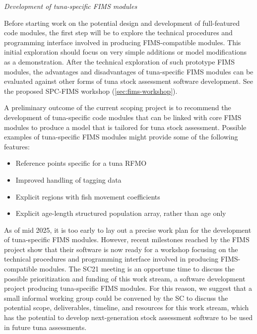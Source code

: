 \documentclass{SCreport}
\begin{document}
\vspace{2ex}

\textit{Development of tuna-specific FIMS modules}

Before starting work on the potential design and development of full-featured
code modules, the first step will be to explore the technical procedures and
programming interface involved in producing FIMS-compatible modules. This
initial exploration should focus on very simple additions or model modifications
as a demonstration. After the technical exploration of such prototype FIMS
modules, the advantages and disadvantages of tuna-specific FIMS modules can be
evaluated against other forms of tuna stock assessment software development. See
the proposed SPC-FIMS workshop (\autoref{sec:fims-workshop}).

A preliminary outcome of the current scoping project is to recommend the
development of tuna-specific code modules that can be linked with core FIMS
modules to produce a model that is tailored for tuna stock assessment. Possible
examples of tuna-specific FIMS modules might provide some of the following
features:

\begin{itemize}
  \item Reference points specific for a tuna RFMO\\[-4.5ex]
  \item Improved handling of tagging data\\[-4.5ex]
  \item Explicit regions with fish movement coefficients\\[-4.5ex]
  \item Explicit age-length structured population array, rather than age only
\end{itemize}

As of mid 2025, it is too early to lay out a precise work plan for the
development of tuna-specific FIMS modules. However, recent milestones reached by
the FIMS project show that their software is now ready for a workshop focusing
on the technical procedures and programming interface involved in producing
FIMS-compatible modules. The SC21 meeting is an opportune time to discuss the
possible prioritization and funding of this work stream, a software development
project producing tuna-specific FIMS modules. For this reason, we suggest that a
small informal working group could be convened by the SC to discuss the
potential scope, deliverables, timeline, and resources for this work stream,
which has the potential to develop next-generation stock assessment software to
be used in future tuna assessments.
\end{document}
